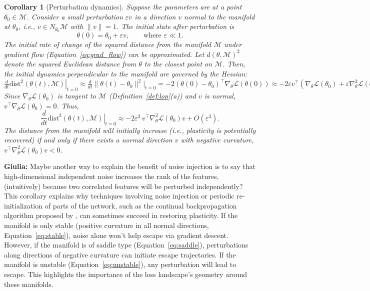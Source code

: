 \documentclass{article}
\newcommand{\Loss}{\mathcal{L}}
\newcommand{\giulia}[1]{{\color{ForestGreen}\textbf{Giulia:} #1}}
\newtheorem{corollary}{Corollary}[section]
\begin{document}
\begin{corollary}[Perturbation dynamics]
\label{cor:perturb}
Suppose the parameters are at a point $\theta_0 \in \mathcal{M}$. Consider a small perturbation $\varepsilon v$ in a direction $v$ normal to the manifold at $\theta_0$, i.e., $v \in N_{\theta_0}\mathcal{M}$ with $\|v\|=1$. The initial state after perturbation is
\[
\theta(0)=\theta_0+\varepsilon v,\qquad \text{where } \varepsilon \ll 1.
\]
The initial rate of change of the squared distance from the manifold $\mathcal{M}$ under gradient flow (Equation~\ref{eq:grad_flow}) can be approximated. Let $d(\theta, \mathcal{M})^2$ denote the squared Euclidean distance from $\theta$ to the closest point on $\mathcal{M}$. Then, the initial dynamics perpendicular to the manifold are governed by the Hessian:
\(
\frac{d}{dt}\left.\mathrm{dist}^2(\theta(t),\mathcal{M})\right|_{t=0} \approx \frac{d}{dt} \|\theta(t) - \theta_0\|^2 \Big|_{t=0} = -2 (\theta(0)-\theta_0)^\top \nabla_\theta \Loss(\theta(0)) \approx -2 \varepsilon v^\top (\nabla_\theta \Loss(\theta_0) + \varepsilon \nabla_\theta^2 \Loss(\theta_0) v)
\)
Since $\nabla_\theta \Loss(\theta_0)$ is tangent to $\mathcal{M}$ (Definition~\ref{def:lop}(a)) and $v$ is normal, $v^\top \nabla_\theta \Loss(\theta_0) = 0$. Thus,
\[
\frac{d}{dt}\left.\mathrm{dist}^2(\theta(t),\mathcal{M})\right|_{t=0} \approx -2\varepsilon^2\,v^\top\nabla_\theta^2\Loss(\theta_0)v + O(\varepsilon^3).
\]
The distance from the manifold will initially increase (i.e., plasticity is potentially recovered) if and only if there exists a normal direction $v$ with negative curvature, $v^\top\nabla_\theta^2\Loss(\theta_0)v < 0$.
\end{corollary}

\giulia{Maybe another way to explain the benefit of noise injection is to say that high-dimensional independent noise increases the rank of the features, (intuitively) because two correlated features will be perturbed independently?}
This corollary explains why techniques involving noise injection or periodic re-initialization of parts of the network, such as the continual backpropagation algorithm proposed by \cite{dohare2024loss} , can sometimes succeed in restoring plasticity. If the manifold is only stable (positive curvature in all normal directions, Equation~\ref{eq:stable}), noise alone won't help escape via gradient descent. However, if the manifold is of saddle type (Equation~\ref{eq:saddle}), perturbations along directions of negative curvature can initiate escape trajectories. If the manifold is unstable (Equation~\ref{eq:unstable}), any perturbation will lead to escape. This highlights the importance of the loss landscape's geometry around these manifolds.
\end{document}
